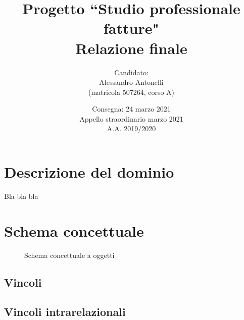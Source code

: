 \documentclass[a4paper,12pt]{article}
\title { \vspace{-1.0cm}{\small Università di Pisa\\Dipartimento di Informatica\\Corso di Laurea in Informatica\\[0.5cm]Corso di Basi di Dati (244AA), prof. Giorgio Ghelli\\[0.7cm]}Progetto ``Studio professionale fatture"\\Relazione finale }
\author { Candidato:\\Alessandro Antonelli\\(matricola 507264, corso A) }
\date { Consegna: 24 marzo 2021\\Appello straordinario marzo 2021\\A.A. 2019/2020 }
\begin{document}
 \maketitle
 
 \tableofcontents

\listoffigures

\lstlistoflistings

 \clearpage
 

 \section{ Descrizione del dominio }

Bla bla bla

 \section{ Schema concettuale }

\begin{figure}[h]
    \centering
    \caption{Schema concettuale a oggetti}
    \centerline{
	  }
    \label{GraficoConcettuale}
\end{figure}


 \subsection{ Vincoli }

 \subsection{ Vincoli intrarelazionali }
\end{document}
